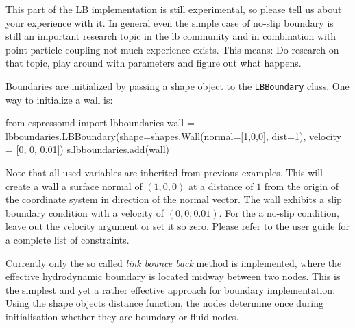 This part of the LB implementation is still experimental,
so please tell us about your experience with it. In general even the simple case of no-slip
boundary is still an important research topic in the lb community and in combination with
point particle coupling not much experience exists. This means: Do research on that topic, play
around with parameters and figure out what happens. 

Boundaries are initialized by passing a shape object to the \texttt{LBBoundary}
class. One way to initialize a wall is:
\begin{pypresso}
  from espressomd import lbboundaries
  wall = lbboundaries.LBBoundary(shape=shapes.Wall(normal=[1,0,0], dist=1), velocity = [0, 0, 0.01])
  s.lbboundaries.add(wall)
\end{pypresso}
Note that all used variables are inherited from previous examples. This will
create a wall a surface normal of $(1,0,0)$ at a distance of $1$ from the origin
of the coordinate system in direction of the normal vector. The wall exhibits a
slip boundary condition with a velocity of $(0,0,0.01)$. For the a no-slip
condition, leave out the velocity argument or set it so zero. Please refer to the
user guide for a complete list of constraints.

Currently only the so called \emph{link bounce back} method is implemented, where the effective
hydrodynamic boundary is located midway between two nodes. This is the simplest and yet a 
rather effective approach for boundary implementation. Using the shape objects
distance function, the nodes determine once during initialisation whether they
are boundary or fluid nodes.

